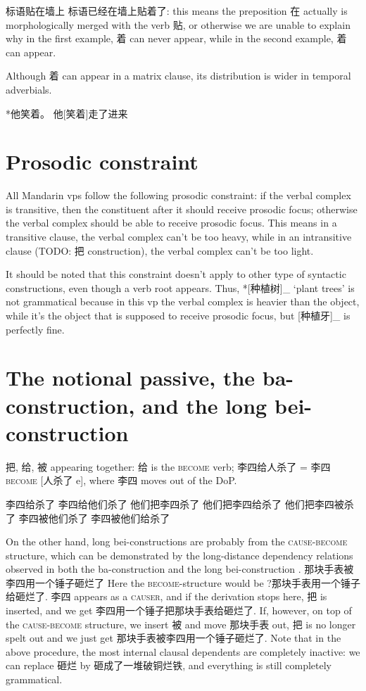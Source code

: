 \documentclass[UTF8, a4paper, oneside, scheme=plain]{ctexrep}
\newcommand*{\citesec}[1]{\S~{#1}}
\newcommand{\translate}[1]{`#1'}
\newcommand*{\category}[1]{\textsc{#1}}
\begin{document}
标语贴在墙上 标语已经在墙上贴着了: 
this means the preposition 在 actually is morphologically merged with the verb 贴, 
or otherwise we are unable to explain why 
in the first example, 着 can never appear, 
while in the second example, 着 can appear.

Although 着 can appear in a matrix clause, 
its distribution is wider in temporal adverbials. 

*他笑着。
他[笑着]走了进来

\section{Prosodic constraint}\label{sec:vp.prosody}

All Mandarin \acs{vp}s follow the following prosodic constraint:
if the verbal complex is transitive,
then the constituent after it should receive prosodic focus; 
otherwise the verbal complex should be able to receive prosodic focus. 
This means in a transitive clause, 
the verbal complex can't be too heavy, 
while in an intransitive clause (TODO: 把 construction), 
the verbal complex can't be too light. 

It should be noted that this constraint doesn't apply 
to other type of syntactic constructions, 
even though a verb root appears. 
Thus, *[种植树]_{} \translate{plant trees} 
is not grammatical
because in this \acs{vp} the verbal complex is heavier than the object, 
while it's the object that is supposed to receive prosodic focus, 
but [种植牙]_{} is perfectly fine. 

\section{The notional passive, the ba-construction, and the long bei-construction}

把, 给, 被 appearing together: 给 is the \category{become} verb; 
李四给人杀了 = 李四 \category{become} [人杀了 e], 
where 李四 moves out of the DoP.

\begin{exe}
    \ex 李四给杀了
    \ex 李四给他们杀了
    \ex 他们把李四杀了
    \ex 他们把李四给杀了
    \ex *他们把李四被杀了
    \ex 李四被他们杀了
    \ex 李四被他们给杀了
\end{exe}

On the other hand, long bei-constructions are probably 
from the \category{cause}-\category{become} structure,
which can be demonstrated by the long-distance dependency relations 
observed in both the ba-construction  
and the long bei-construction
\citep[\citesec{4.2.1.5}]{huang2013}.
那块手表被李四用一个锤子砸烂了 
Here the \category{become}-structure would be 
?那块手表用一个锤子给砸烂了. 
李四 appears as a \category{causer},
and if the derivation stops here, 
把 is inserted, and we get 李四用一个锤子把那块手表给砸烂了.
If, however, on top of the \category{cause}-\category{become} structure, 
we insert 被 and move 那块手表 out, 
把 is no longer spelt out 
and we just get 那块手表被李四用一个锤子砸烂了.
Note that in the above procedure, 
the most internal clausal dependents are completely inactive: 
we can replace 砸烂 by 砸成了一堆破铜烂铁, 
and everything is still completely grammatical.
\end{document}
